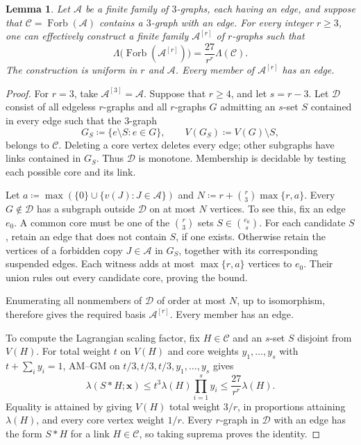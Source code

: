 \documentclass[10pt]{article}
\numberwithin{equation}{section}
\newtheorem{lemma}[lemma]{Lemma}\aliascntresetthe{lemma}
\theoremstyle{definition}
\newcommand{\Forb}{\operatorname{Forb}}\newcommand{\Ext}{\operatorname{Ext}}
\newcommand{\x}{\boldsymbol{x}}\newcommand{\y}{\boldsymbol{y}}
\begin{document}
\begin{lemma}\label{lem:v3-effective-suspension}
Let $\mathcal A$ be a finite family of $3$-graphs, each having an edge, and suppose that $\mathcal C=\Forb(\mathcal A)$ contains a $3$-graph with an edge. For every integer $r\ge3$, one can effectively construct a finite family $\mathcal A^{[r]}$ of $r$-graphs such that
\[
 \Lambda\bigl(\Forb(\mathcal A^{[r]})\bigr)
 =\frac{27}{r^r}\Lambda(\mathcal C).
\]
The construction is uniform in $r$ and $\mathcal A$. Every member of $\mathcal A^{[r]}$ has an edge.
\end{lemma}
\begin{proof}
For $r=3$, take $\mathcal A^{[3]}=\mathcal A$. Suppose that $r\ge4$, and let $s=r-3$. Let $\mathcal D$ consist of all edgeless $r$-graphs and all $r$-graphs $G$ admitting an $s$-set $S$ contained in every edge such that the $3$-graph
\[
 G_S\coloneqq\bigl\{e\setminus S\colon e\in G\bigr\},
 \qquad V(G_S)\coloneqq V(G)\setminus S,
\]
belongs to $\mathcal C$. Deleting a core vertex deletes every edge; other subgraphs have links contained in $G_S$. Thus $\mathcal D$ is monotone. Membership is decidable by testing each possible core and its link.

Let $a\coloneqq\max(\{0\}\cup\{v(J)\colon J\in\mathcal A\})$ and $N\coloneqq r+\binom r3\max\{r,a\}$. Every $G\notin\mathcal D$ has a subgraph outside $\mathcal D$ on at most $N$ vertices. To see this, fix an edge $e_0$. A common core must be one of the $\binom r3$ sets $S\in\binom{e_0}s$. For each candidate $S$, retain an edge that does not contain $S$, if one exists. Otherwise retain the vertices of a forbidden copy $J\in\mathcal A$ in $G_S$, together with its corresponding suspended edges. Each witness adds at most $\max\{r,a\}$ vertices to $e_0$. Their union rules out every candidate core, proving the bound.

Enumerating all nonmembers of $\mathcal D$ of order at most $N$, up to isomorphism, therefore gives the required basis $\mathcal A^{[r]}$. Every member has an edge.

To compute the Lagrangian scaling factor, fix $H\in\mathcal C$ and an $s$-set $S$ disjoint from $V(H)$. For total weight $t$ on $V(H)$ and core weights $y_1,\ldots,y_s$ with $t+\sum_i y_i=1$, AM--GM on $t/3,t/3,t/3,y_1,\ldots,y_s$ gives
\[
 \lambda(S*H;\x)\le t^3\lambda(H)\prod_{i=1}^s y_i
 \le\frac{27}{r^r}\lambda(H).
\]
Equality is attained by giving $V(H)$ total weight $3/r$, in proportions attaining $\lambda(H)$, and every core vertex weight $1/r$. Every $r$-graph in $\mathcal D$ with an edge has the form $S*H$ for a link $H\in\mathcal C$, so taking suprema proves the identity.
\end{proof}
\end{document}
